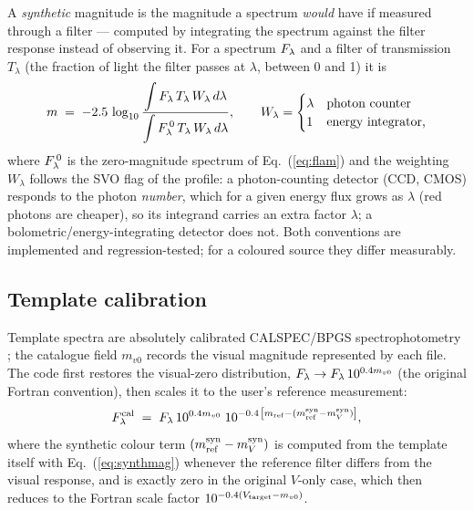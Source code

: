 A \emph{synthetic} magnitude is the magnitude a spectrum \emph{would}
have if measured through a filter — computed by integrating the spectrum
against the filter response instead of observing it. For a spectrum
$F_\lambda$ and a filter of transmission $T_\lambda$ (the fraction of light
the filter passes at $\lambda$, between 0 and 1) it is
\begin{equation}
  m \;=\; -2.5\,\log_{10}
  \frac{\displaystyle\int F_\lambda\,T_\lambda\, W_\lambda\, d\lambda}
       {\displaystyle\int F_\lambda^{\,0}\,T_\lambda\, W_\lambda\, d\lambda},
  \qquad
  W_\lambda = \begin{cases}\lambda & \text{photon counter}\\
                            1 & \text{energy integrator,}\end{cases}
  \label{eq:synthmag}
\end{equation}
where $F_\lambda^{\,0}$ is the zero-magnitude spectrum of
Eq.~(\ref{eq:flam}) and the weighting $W_\lambda$ follows the SVO
 flag of the profile: a photon-counting detector (CCD,
CMOS) responds to the photon \emph{number}, which for a given energy flux
grows as $\lambda$ (red photons are cheaper), so its integrand carries an
extra factor $\lambda$; a bolometric/energy-integrating detector does not.
Both conventions are implemented and regression-tested; for a coloured
source they differ measurably.

\subsection{Template calibration}
\label{sec:template}

Template spectra are absolutely calibrated CALSPEC/BPGS spectrophotometry
\citep{bohlin2014}; the catalogue field $m_{v0}$ records the visual magnitude
represented by each file. The code first restores the visual-zero
distribution, $F_\lambda \rightarrow F_\lambda\,10^{0.4 m_{v0}}$ (the original
Fortran convention), then scales it to the user's reference measurement:
\begin{equation}
  F_\lambda^{\rm cal} \;=\; F_\lambda\,10^{0.4 m_{v0}}\;
  10^{-0.4\,\left[m_{\rm ref} - (m_{\rm ref}^{\rm syn}-m_{V}^{\rm syn})\right]},
\end{equation}
where the synthetic colour term $(m_{\rm ref}^{\rm syn}-m_{V}^{\rm syn})$ is
computed from the template itself with Eq.~(\ref{eq:synthmag}) whenever the
reference filter differs from the visual response, and is exactly zero in the
original $V$-only case, which then reduces to the Fortran scale factor
$10^{-0.4(V_{\rm target}-m_{v0})}$.

